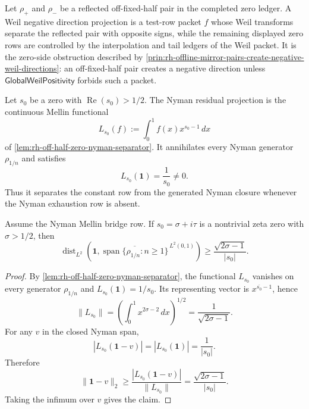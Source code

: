 \begin{definition}
\label{def:rh-weil-negative-direction-projection}
Let $\rho_+$ and $\rho_-$ be a reflected off-fixed-half pair in the
completed zero ledger.  A Weil negative direction projection is a
test-row packet $f$ whose Weil transforms separate the reflected pair
with opposite signs, while the remaining displayed zero rows are
controlled by the interpolation and tail ledgers of the Weil packet.  It
is the zero-side obstruction described by
\autoref{prin:rh-offline-mirror-pairs-create-negative-weil-directions}: an
off-fixed-half pair creates a negative direction unless
$\mathsf{GlobalWeilPositivity}$ forbids such a packet.
\end{definition}

\begin{definition}
\label{def:rh-nyman-residual-projection}
Let $s_0$ be a zero with $\operatorname{Re}(s_0)>1/2$.  The Nyman
residual projection is the continuous Mellin functional
$$
L_{s_0}(f):=\int_0^1 f(x)x^{s_0-1}\,dx
$$
of \autoref{lem:rh-off-half-zero-nyman-separator}.  It annihilates every
Nyman generator $\rho_{1/n}$ and satisfies
$$
L_{s_0}(\mathbf 1)=\frac{1}{s_0}\ne0.
$$
Thus it separates the constant row from the generated Nyman closure
whenever the Nyman exhaustion row is absent.
\end{definition}

\begin{theorem}
\label{thm:rh-nyman-separator-quantitative-residual}
Assume the Nyman Mellin bridge row.  If $s_0=\sigma+i\tau$ is a
nontrivial zeta zero with $\sigma>1/2$, then
$$
\operatorname{dist}_{L^2}
\left(
\mathbf 1,
\overline{\operatorname{span}\{\rho_{1/n}:n\ge1\}}^{\,L^2(0,1)}
\right)
\ge
\frac{\sqrt{2\sigma-1}}{|s_0|}.
$$
\end{theorem}

\begin{proof}
By \autoref{lem:rh-off-half-zero-nyman-separator}, the functional
$L_{s_0}$ vanishes on every generator $\rho_{1/n}$ and
$L_{s_0}(\mathbf 1)=1/s_0$.  Its representing vector is
$x^{\overline{s_0}-1}$, hence
$$
\|L_{s_0}\|
=
\left(\int_0^1 x^{2\sigma-2}\,dx\right)^{1/2}
=
\frac{1}{\sqrt{2\sigma-1}}.
$$
For any $v$ in the closed Nyman span,
$$
|L_{s_0}(\mathbf 1-v)|
=
|L_{s_0}(\mathbf 1)|
=
\frac{1}{|s_0|}.
$$
Therefore
$$
\|\mathbf 1-v\|_2
\ge
\frac{|L_{s_0}(\mathbf 1-v)|}{\|L_{s_0}\|}
=
\frac{\sqrt{2\sigma-1}}{|s_0|}.
$$
Taking the infimum over $v$ gives the claim.
\end{proof}


